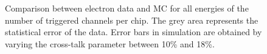 \begin{figure}[htbp]
	\hfill
	\hfill
	\caption[]{Comparison between electron data and MC for all energies of the number of triggered channels per chip. The grey area represents the statistical error of the data. Error bars in simulation are obtained by varying the cross-talk parameter between 10\% and 18\%.}
	\label{fig:sim_data_elec_nHits}
\end{figure}
